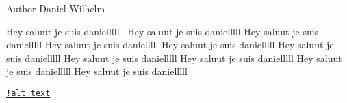 \begin{DoxyAuthor}{Author}
Daniel Wilhelm
\end{DoxyAuthor}
Hey saluut je suis danielllll~\newline
Hey saluut je suis danielllll Hey saluut je suis danielllll Hey saluut je suis danielllll Hey saluut je suis danielllll Hey saluut je suis danielllll Hey saluut je suis danielllll Hey saluut je suis danielllll Hey saluut je suis danielllll Hey saluut je suis danielllll

\href{https://github.com/Wilhelm2/ErrorDetectors/blob/master/documentation/mainpage/errorDetectorInheritance.png}{\tt !alt text} 